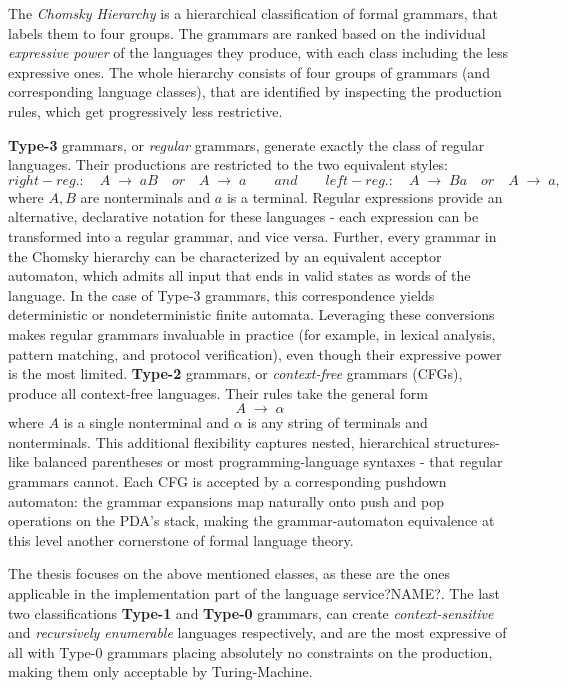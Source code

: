 The \textit{Chomsky Hierarchy} is a hierarchical classification of formal grammars, that labels them to four groups. The grammars are ranked based on the
individual \textit{expressive power} of the languages they produce, with each class including the less expressive ones. The whole hierarchy consists of four
groups of grammars (and corresponding language classes), that are identified by inspecting the production rules, which get progressively less restrictive.

\textbf{Type-3} grammars, or \emph{regular} grammars, generate exactly the class of regular languages. Their productions are restricted to the two equivalent styles:
\[
  right-reg.: \quad A \;\to\; aB \quad or \quad A \;\to\; a
  \qquad and \qquad
  left-reg.: \quad A \;\to\; Ba \quad or \quad A \;\to\; a,
\]
where \(A,B\) are nonterminals and \(a\) is a terminal. Regular expressions provide an alternative, declarative notation for these languages - each expression
can be transformed into a regular grammar, and vice versa. Further, every grammar in the Chomsky hierarchy can be characterized by an equivalent acceptor automaton, which admits all input that ends in valid states as words of the language.
In the case of Type-3 grammars, this correspondence yields deterministic or nondeterministic finite automata. Leveraging these conversions makes regular grammars
invaluable in practice (for example, in lexical analysis, pattern matching, and protocol verification), even though their expressive power is the most limited.
\textbf{Type-2} grammars, or \emph{context-free} grammars (CFGs), produce all context-free languages.
Their rules take the general form  \[A \;\to\; \alpha\] where \(A\) is a single nonterminal and \(\alpha\) is any string of terminals and nonterminals.
This additional flexibility captures nested, hierarchical structures-like balanced parentheses or most programming-language syntaxes - that regular grammars cannot.
Each CFG is accepted by a corresponding pushdown automaton: the grammar expansions map naturally onto push and pop operations on the PDA's stack, making the grammar-automaton
equivalence at this level another cornerstone of formal language theory.

The thesis focuses on the above mentioned classes, as these are the ones applicable in the implementation part of the language service?NAME?. The last two classifications
\textbf{Type-1} and \textbf{Type-0} grammars, can create \textit{context-sensitive} and \textit{recursively enumerable} languages respectively, and are the most expressive
of all with Type-0 grammars placing absolutely no constraints on the production, making them only acceptable by Turing-Machine.

